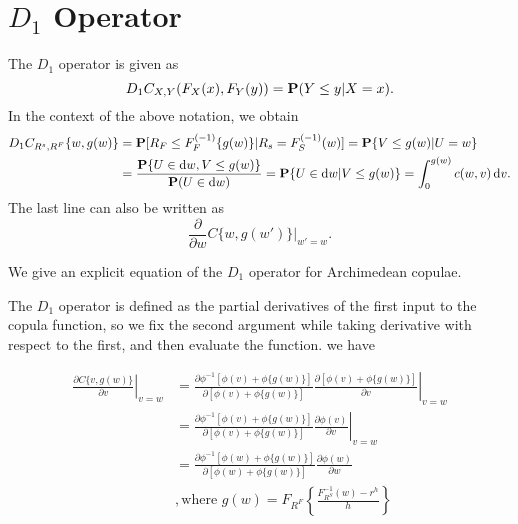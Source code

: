 
\section{$D_1$ Operator}


The $D_1$ operator is given as
\begin{equation*}
    D_1 C_{X,Y}(F_X(x), F_Y(y)) = {\bf P}(Y\leq y|X=x).
\end{equation*}
In the context of the above notation, we obtain
\begin{align*}
  D_1 C_{R^s, R^F}\{w, g(w)\} &= \p[R_F\leq F_{F}^{(-1)}\{g(w)\}|
  R_s=F_S^{(-1)}(w)] %
  = \p\{V\leq g(w)| U=w\}\\ %
  &= \frac{\p\{U\in \dd w, V\leq g(w)\}} {\p(U\in \dd w)} %
  = \p\{U\in \dd w| V\leq g(w)\} %
  = \int_0^{g(w)} c(w,v)\, \dd v. 
\end{align*}
The last line can also be written as 
\begin{equation*}
  \frac{\partial }{\partial w} C\{w, g(w')\} \big|_{w'=w}.
\end{equation*}



We give an explicit equation of the $D_1$ operator for Archimedean copulae.

The $D_1$ operator is defined as the partial derivatives of the first input to the copula function,
so we fix the second argument while taking derivative with respect to the first, and then evaluate the function.
we have

\begin{align}
\left.\frac{\partial C\{v, g(w)\}}{\partial v} \right\vert_{v=w}
&=
\left.\frac{\partial  \phi^{-1}[\phi(v)+\phi\{g(w)\}]}
{\partial  [\phi(v)+\phi\{g(w)\}]}
\frac{\partial  [\phi(v)+\phi\{g(w)\}]}
{\partial  v}
\right\vert_{v=w}\\
&=
\left.\frac{\partial   \phi^{-1}[\phi(v)+\phi\{g(w)\}]}
{\partial [\phi(v)+\phi\{g(w)\}]}
\frac{\partial  \phi(v)}{\partial  v}
\right\vert_{v=w}\\
&=
\frac{\partial \phi^{-1}[\phi(w)+\phi\{g(w)\}]}
{\partial [\phi(w)+\phi\{g(w)\}]}
\frac{\partial  \phi(w)}{\partial  w}\\
&,
\text{where } g(w) = F_{R^F}\left\{\frac{F^{-1}_{R^S}(w)-r^h}{h}\right\}\\
\end{align}


